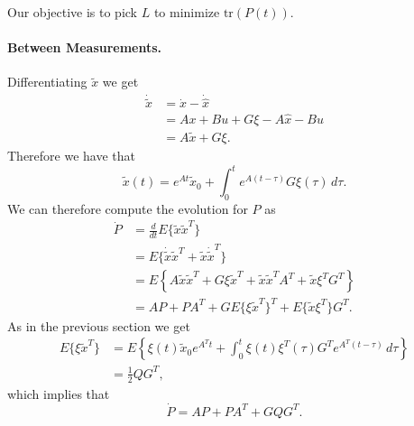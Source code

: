 {\par\noindent Our objective is to pick $L$ to minimize $\text{tr}(P(t))$.

\paragraph{Between Measurements.}

Differentiating $\tilde{x}$ we get
\begin{align*}
\dot{\tilde{x}} &= \dot{x} - \dot{\hat{x}} \\
&= Ax + Bu + G\xi - A\hat{x} - Bu \\
&= A\tilde{x} + G\xi.
\end{align*}
Therefore we have that
\[
\tilde{x}(t) = e^{At}\tilde{x}_0 + \int_0^t
e^{A(t-\tau)}G\xi(\tau)\,d\tau.
\]
We can therefore compute the evolution for $P$ as
\begin{align*}
\dot{P} &= \frac{d}{dt} E\{\tilde{x}\tilde{x}^T\} \\
&= E\{ \dot{\tilde{x}}\tilde{x}^T + \tilde{x}\dot{\tilde{x}}^T \} \\
&= E\left\{ A\tilde{x}\tilde{x}^T + G\xi\tilde{x}^T +
\tilde{x}\tilde{x}^TA^T + \tilde{x}\xi^TG^T \right\} \\
&= AP + PA^T + GE\{\xi\tilde{x}^T\}^T + E\{\tilde{x}\xi^T\}G^T.
\end{align*}
As in the previous section we get
\begin{align*}
E\{\xi\tilde{x}^T\} &= E\left\{ \xi(t) \tilde{x}_0 e^{A^Tt} +
\int_0^t \xi(t)\xi^T(\tau)G^Te^{A^T(t-\tau)}\,d\tau \right\} \\
&= \frac{1}{2} QG^T,
\end{align*}
which implies that
\[
\dot{P} = AP + PA^T + GQG^T.
\]

}
